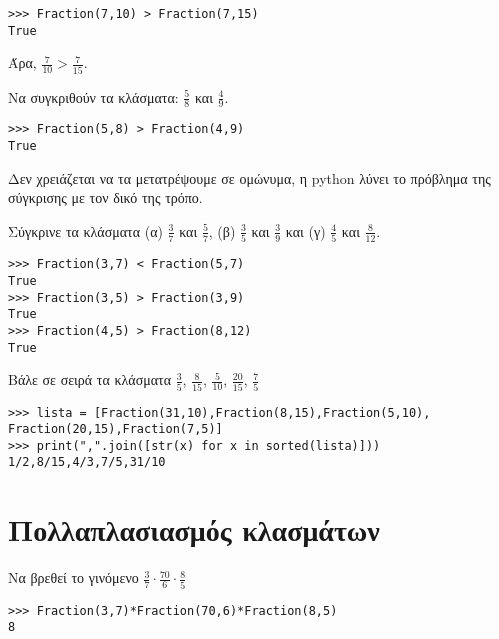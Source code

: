 \begin{lstlisting}
>>> Fraction(7,10) > Fraction(7,15)
True
\end{lstlisting}

Άρα, $\frac{7}{10}>\frac{7}{15}$.

\begin{exercise}Να συγκριθούν τα κλάσματα: $\frac{5}{8}$ και $\frac{4}{9}$.\end{exercise}

\begin{lstlisting}
>>> Fraction(5,8) > Fraction(4,9)
True
\end{lstlisting}

Δεν χρειάζεται να τα μετατρέψουμε σε ομώνυμα, η python λύνει το πρόβλημα της σύγκρισης με τον δικό της τρόπο.

\begin{exercise}
Σύγκρινε τα κλάσματα (α) $\frac{3}{7}$ και $\frac{5}{7}$, (β) $\frac{3}{5}$ και $\frac{3}{9}$ και (γ) $\frac{4}{5}$ και $\frac{8}{12}$.
\end{exercise}

\begin{lstlisting}
>>> Fraction(3,7) < Fraction(5,7)
True
>>> Fraction(3,5) > Fraction(3,9)
True
>>> Fraction(4,5) > Fraction(8,12)
True
\end{lstlisting}

\begin{exercise}Βάλε σε σειρά τα κλάσματα $\frac{3}{5}$, $\frac{8}{15}$, $\frac{5}{10}$, $\frac{20}{15}$, $\frac{7}{5}$\end{exercise}

\begin{lstlisting}
>>> lista = [Fraction(31,10),Fraction(8,15),Fraction(5,10),
Fraction(20,15),Fraction(7,5)]
>>> print(",".join([str(x) for x in sorted(lista)]))
1/2,8/15,4/3,7/5,31/10
\end{lstlisting}

\section{Πολλαπλασιασμός κλασμάτων}

\begin{exercise}Να βρεθεί το γινόμενο $\frac{3}{7}\cdot\frac{70}{6}\cdot\frac{8}{5}$\end{exercise}

\begin{lstlisting}
>>> Fraction(3,7)*Fraction(70,6)*Fraction(8,5)
8
\end{lstlisting}

